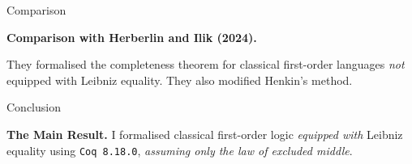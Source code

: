 \documentclass[serif,table,10pt]{beamer}
\newcommand{\0}{\texttt{0}}
\newcommand{\1}{\texttt{1}}
\begin{document}
\begin{frame}{Comparison}
    
    \textbf{Comparison with Herberlin and Ilik (2024).}

    They formalised the completeness theorem for classical first-order languages \textit{not} equipped with Leibniz equality. They also modified Henkin's method.

\end{frame}

\begin{frame}{Conclusion}

    \textbf{The Main Result.}
    I formalised classical first-order logic \textit{equipped with} Leibniz equality using \texttt{Coq 8.18.0}, \textit{assuming only the law of excluded middle}.

    \begin{minipage}{1.0\textwidth}
    \end{minipage}

\end{frame}
\end{document}
